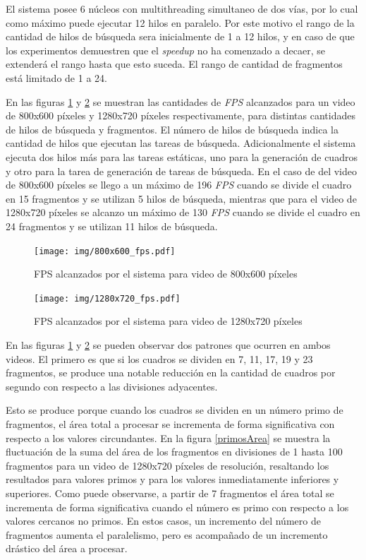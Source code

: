 El sistema posee 6 núcleos con multithreading simultaneo de dos vías, por lo
cual como máximo puede ejecutar 12 hilos en paralelo. Por este motivo el rango
de la cantidad de hilos de búsqueda sera inicialmente de 1 a 12 hilos, y en caso
de que los experimentos demuestren que el \emph{speedup} no ha comenzado a
decaer, se extenderá el rango hasta que esto suceda. El rango de cantidad de
fragmentos está limitado de 1 a 24.

En las figuras \ref{800fps} y \ref{1280fps} se muestran las cantidades de
\emph{FPS} alcanzados para un video de 800x600 píxeles y 1280x720 píxeles
respectivamente, para distintas cantidades de hilos de búsqueda y fragmentos.
El número de hilos de búsqueda indica la cantidad de hilos que ejecutan las
tareas de búsqueda. Adicionalmente el sistema ejecuta dos hilos más para las
tareas estáticas, uno para la generación de cuadros y otro para la tarea de
generación de tareas de búsqueda. En el caso de del video de 800x600 píxeles se
llego a un máximo de 196 \emph{FPS} cuando se divide el cuadro en 15 fragmentos
y se utilizan 5 hilos de búsqueda, mientras que para el video de 1280x720
píxeles se alcanzo un máximo de 130 \emph{FPS} cuando se divide el cuadro en 24
fragmentos y se utilizan 11 hilos de búsqueda.

\begin{figure}[h]

	\texttt{[image: img/800x600\_fps.pdf]}
	\caption{FPS alcanzados por el sistema para video de 800x600 píxeles}
	\label{800fps}

\end{figure}

\begin{figure}[h]

	\texttt{[image: img/1280x720\_fps.pdf]}
	\caption{FPS alcanzados por el sistema para video de 1280x720 píxeles}
	\label{1280fps}

\end{figure}

En las figuras \ref{800fps} y \ref{1280fps} se pueden observar dos patrones que
ocurren en ambos videos. El primero es que si los cuadros se dividen en 7, 11,
17, 19 y 23 fragmentos, se produce una notable reducción en la cantidad de
cuadros por segundo con respecto a las divisiones adyacentes.

Esto se produce porque cuando los cuadros se dividen en un número primo de
fragmentos, el área total a procesar se incrementa de forma significativa con
respecto a los valores circundantes. En la figura \ref{primosArea} se muestra la
fluctuación de la suma del área de los fragmentos en divisiones de 1 hasta 100
fragmentos para un video de 1280x720 píxeles de resolución, resaltando los
resultados para valores primos y para los valores inmediatamente inferiores y
superiores. Como puede observarse, a partir de 7 fragmentos el área total se
incrementa de forma significativa cuando el número es primo con respecto a los
valores cercanos no primos. En estos casos, un incremento del número de
fragmentos aumenta el paralelismo, pero es acompañado de un incremento drástico
del área a procesar.

